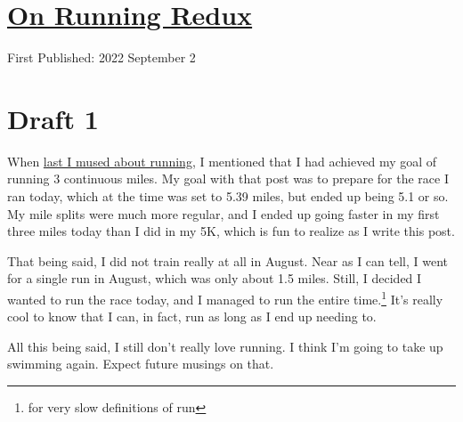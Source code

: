 \documentclass[12pt]{article}[titlepage]
\newcommand{\1}{\={a}}
\newcommand{\2}{\={e}}
\newcommand{\3}{\={\i}}
\newcommand{\4}{\=o}
\newcommand{\5}{\=u}
\newcommand{\6}{\={A}}
\renewcommand{\,}{\textsuperscript{,}}
\begin{document}
\doublespacing
\section{\href{running-1.html}{On Running Redux}}
First Published: 2022 September 2
\section{Draft 1}
When \href{running.html}{last I mused about running}, I mentioned that I had achieved my goal of running 3 continuous miles.
My goal with that post was to prepare for the race I ran today, which at the time was set to 5.39 miles, but ended up being 5.1 or so.
My mile splits were much more regular, and I ended up going faster in my first three miles today than I did in my 5K, which is fun to realize as I write this post.

That being said, I did not train really at all in August.
Near as I can tell, I went for a single run in August, which was only about 1.5 miles.
Still, I decided I wanted to run the race today, and I managed to run the entire time.\footnote{for very slow definitions of run}
It's really cool to know that I can, in fact, run as long as I end up needing to.

All this being said, I still don't really love running.
I think I'm going to take up swimming again.
Expect future musings on that.
\end{document}
